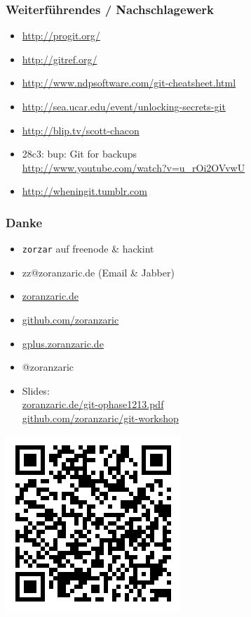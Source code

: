 \documentclass[]{beamer}
\begin{document}
\begin{frame}
	\frametitle{Weiterführendes / Nachschlagewerk}
	\begin{itemize}
		\item
			\url{http://progit.org/}
		\item
			\url{http://gitref.org/}
		\item
			\url{http://www.ndpsoftware.com/git-cheatsheet.html}
		\item
			\url{http://sea.ucar.edu/event/unlocking-secrets-git}
		\item
			\url{http://blip.tv/scott-chacon}
		\item
			28c3: bup: Git for backups\\
			\url{http://www.youtube.com/watch?v=u_rOi2OVvwU}
		\item
			\url{http://wheningit.tumblr.com}
	\end{itemize}
\end{frame}

\begin{frame}[fragile]
	\frametitle{Danke}
	\begin{itemize}
		\item
			\verb|zorzar| auf freenode \& hackint
		\item
			zz@zoranzaric.de (Email \& Jabber)
		\item
			\url{zoranzaric.de}
		\item
			\url{github.com/zoranzaric}
		\item
			\url{gplus.zoranzaric.de}
		\item
			@zoranzaric\\[0.5cm]
		\item
			Slides:\\
			\url{zoranzaric.de/git-ophase1213.pdf}\\
			\url{github.com/zoranzaric/git-workshop}
	\end{itemize}
\end{frame}

\begin{frame}
	\includegraphics{qr-code.png}
\end{frame}
\end{document}
